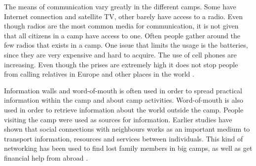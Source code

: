 The means of communication vary greatly in the different camps. Some have Internet connection and satellite TV, other barely have access to a radio. Even though radios are the most common media for communication, it is not given that all citizens in a camp have access to one. Often people gather around the few radios that exists in a camp. One issue that limits the usage is the batteries, since they are very expensive and hard to acquire. The use of cell phones are increasing. Even though the prises are extremely high it does not stop people from calling relatives in Europe and other places in the world \cite{womenRefugee}.

Information walls and word-of-mouth is often used in order to spread practical information within the camp and about camp activities. Word-of-mouth is also used in order to retrieve information about the world outside the camp. People visiting the camp were used as sources for information. Earlier studies have shown that social connections with neighbours works as an important medium to transport information, resources and services between individuals. This kind of networking has been used to find lost family members in big camps, as well as get financial help from abroad \cite{womenRefugee}.  


